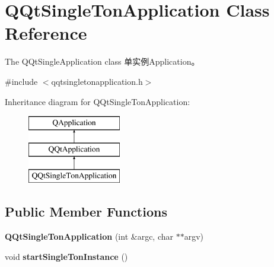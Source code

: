 \hypertarget{class_q_qt_single_ton_application}{}\section{Q\+Qt\+Single\+Ton\+Application Class Reference}
\label{class_q_qt_single_ton_application}


The Q\+Qt\+Single\+Application class 单实例\+Application。  




{\ttfamily \#include $<$qqtsingletonapplication.\+h$>$}

Inheritance diagram for Q\+Qt\+Single\+Ton\+Application\+:\begin{figure}[H]
\begin{center}
\leavevmode
\includegraphics[height=3.000000cm]{class_q_qt_single_ton_application}
\end{center}
\end{figure}
\subsection*{Public Member Functions}
\begin{DoxyCompactItemize}
\item 
\mbox{\label{class_q_qt_single_ton_application_a25f01b4067564d83c978d3cb3a4b1df0}} 
{\bfseries Q\+Qt\+Single\+Ton\+Application} (int \&argc, char $\ast$$\ast$argv)
\item 
\mbox{\label{class_q_qt_single_ton_application_aed2d6d1576f239d22795a57362e67e30}} 
void {\bfseries start\+Single\+Ton\+Instance} ()
\end{DoxyCompactItemize}
